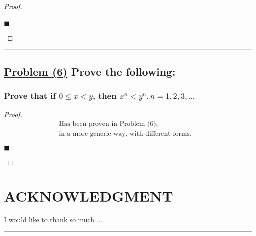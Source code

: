 \documentclass[letterpaper, 10 pt, conference]{ieeeconf}  %
\begin{document}
\begin{proof}
\begin{align}
    
\end{align}
\begin{flushright}
$\blacksquare$
\end{flushright}
\end{proof}

\noindent\rule{8cm}{0.4pt}
\begin{figure}[thpb]
      \centering
\end{figure}
\subsection{\textbf{\underline{Problem (6)} Prove the following:}}

\subsubsection{\textbf{Prove that if $0 \leq x < y$, then $x^n < y^n, n = 1, 2, 3, \ldots $}}

\begin{proof}
\begin{align}
    & \text{Has been proven in Problem (6),} && \\
    & \text{in a more generic way, with different forms.}
\end{align}
\begin{flushright}
$\blacksquare$
\end{flushright}
\end{proof}










\newpage

\section*{ACKNOWLEDGMENT}
I would like to thank so much ...

\noindent\rule{8cm}{0.4pt}
\end{document}
